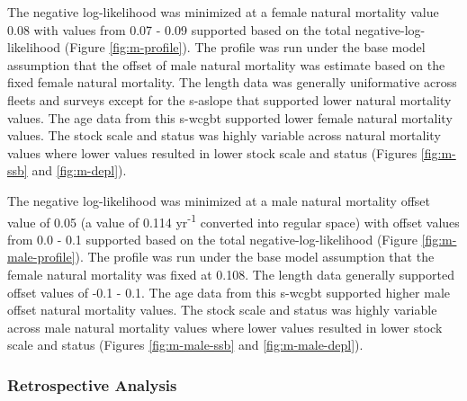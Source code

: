 \documentclass[11pt,
  english,
  a4paper,
]{article}
\begin{document}
\leavevmode\tagmcend\tagstructend\par


The negative log-likelihood was minimized at a female natural mortality value 0.08 with values from 0.07 - 0.09 supported based on the total negative-log-likelihood (Figure \ref{fig:m-profile}). The profile was run under the base model assumption that the offset of male natural mortality was estimate based on the fixed female natural mortality. The length data was generally uniformative across fleets and surveys except for the \gls{s-aslope} that supported lower natural mortality values. The age data from this \gls{s-wcgbt} supported lower female natural mortality values. The stock scale and status was highly variable across natural mortality values where lower values resulted in lower stock scale and status (Figures \ref{fig:m-ssb} and \ref{fig:m-depl}).

\leavevmode\tagmcend\tagstructend\par


The negative log-likelihood was minimized at a male natural mortality offset value of 0.05 (a value of 0.114 yr\textsuperscript{-1} converted into regular space) with offset values from 0.0 - 0.1 supported based on the total negative-log-likelihood (Figure \ref{fig:m-male-profile}). The profile was run under the base model assumption that the female natural mortality was fixed at 0.108. The length data generally supported offset values of -0.1 - 0.1. The age data from this \gls{s-wcgbt} supported higher male offset natural mortality values. The stock scale and status was highly variable across male natural mortality values where lower values resulted in lower stock scale and status (Figures \ref{fig:m-male-ssb} and \ref{fig:m-male-depl}).

\leavevmode\tagmcend\tagstructend\par


\hypertarget{retrospective-analysis}{%
\subsubsection{Retrospective Analysis}\label{retrospective-analysis}}

\leavevmode\tagmcend\tagstructend

\end{document}
